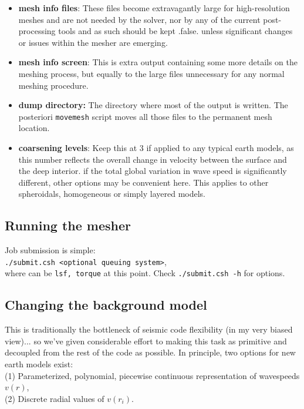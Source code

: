 \documentclass[11pt,letter,fleqn,english,notitlepage]{article}
\begin{document}
\begin{itemize}
\item \textbf{mesh info files}: These files become extravagantly large for high-resolution meshes 
and are not needed by the solver, nor by any of the current post-processing tools and as such should 
be kept .false. unless significant changes or issues within the mesher are emerging.

\item \textbf{mesh info screen}: This is extra output containing some more details on the meshing 
process, but equally to the large files unnecessary for any normal meshing procedure.

\item \textbf{dump directory:} The directory where most of the output is written. The posteriori 
{\tt movemesh} script moves all those files to the permanent mesh location.

\item \textbf{coarsening levels}: Keep this at 3 if applied to any typical earth models, as
this number reflects the overall change in velocity between the surface and the deep interior.
if the total global variation in wave speed is significantly different, 
other options may be convenient here. This applies to other spheroidals, homogeneous 
or simply layered models.
\end{itemize}

\subsection{Running the mesher}
Job submission is simple:\\
{\tt ./submit.csh <optional queuing system>},\\
where {\tt <optional queuing system>} can be {\tt lsf, torque} at this point. Check {\tt ./submit.csh -h} for 
options.

\subsection{Changing the background model}
This is traditionally the bottleneck of seismic code flexibility (in my very biased view)... so 
we've given considerable effort to making this task as primitive and decoupled from the 
rest of the code as possible. In principle, two options for new earth models exist: \\
(1) Parameterized, polynomial, piecewise continuous representation of wavespeeds $v(r)$,\\
(2) Discrete radial values of $v(r_i)$.\\
\end{document}
